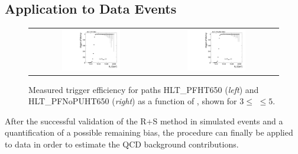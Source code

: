 \subsection{Application to Data Events}
\label{subsec:validation_data_R+S}
\begin{figure}[!t]
  \centering
  \begin{tabular}{cc}
                \includegraphics[width=0.49\textwidth]{figures/turn_on_HT_TagEle27WP80_ProbePFHT650_chs_NJets3-5.pdf} &
                \includegraphics[width=0.49\textwidth]{figures/turn_on_HT_TagEle27WP80_ProbePFNoPUHT650_chs_NJets3-5.pdf} \\
  \end{tabular}
\caption{Measured trigger efficiency for paths HLT\_PFHT650 (\textit{left}) and HLT\_PFNoPUHT650 (\textit{right}) as a function of \HT, shown for $3 \leq$ \NJets $\leq 5$.} 
  \label{fig:trig_eff_650_3njets5}
\end{figure}
After the successful validation of the R+S method in simulated events and a quantification of a possible remaining bias, the procedure can finally be applied to data in order to estimate the QCD background contributions. \\
